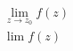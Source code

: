 \documentclass[12pt, a4paper, oneside, UTF8]{ctexbook}
\begin{document}
\newlength\mylena
\newlength\mylenb

\begin{align}
    \lim_{z\rightarrow z_0}f(z)\\
    \lim_{  }f(z)
\end{align}
\end{document}
